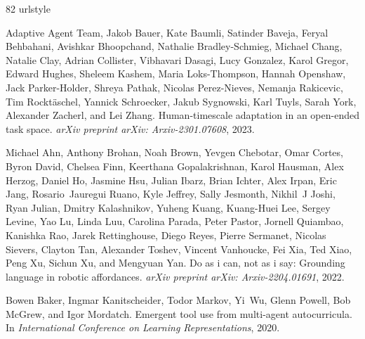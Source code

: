 \documentclass{article}
\begin{document}
\newpage
\begin{thebibliography}{82}
\providecommand{\natexlab}[1]{#1}
\providecommand{\url}[1]{\texttt{#1}}
\expandafter\ifx\csname urlstyle\endcsname\relax
  \providecommand{\doi}[1]{doi: #1}\else
  \providecommand{\doi}{doi: \begingroup \urlstyle{rm}\Url}\fi

{Adaptive Agent Team}, Jakob Bauer, Kate Baumli, Satinder Baveja, Feryal Behbahani, Avishkar Bhoopchand, Nathalie Bradley-Schmieg, Michael Chang, Natalie Clay, Adrian Collister, Vibhavari Dasagi, Lucy Gonzalez, Karol Gregor, Edward Hughes, Sheleem Kashem, Maria Loks-Thompson, Hannah Openshaw, Jack Parker-Holder, Shreya Pathak, Nicolas Perez-Nieves, Nemanja Rakicevic, Tim Rocktäschel, Yannick Schroecker, Jakub Sygnowski, Karl Tuyls, Sarah York, Alexander Zacherl, and Lei Zhang.
\newblock Human-timescale adaptation in an open-ended task space.
\newblock \emph{arXiv preprint arXiv: Arxiv-2301.07608}, 2023.

Michael Ahn, Anthony Brohan, Noah Brown, Yevgen Chebotar, Omar Cortes, Byron David, Chelsea Finn, Keerthana Gopalakrishnan, Karol Hausman, Alex Herzog, Daniel Ho, Jasmine Hsu, Julian Ibarz, Brian Ichter, Alex Irpan, Eric Jang, Rosario~Jauregui Ruano, Kyle Jeffrey, Sally Jesmonth, Nikhil~J Joshi, Ryan Julian, Dmitry Kalashnikov, Yuheng Kuang, Kuang-Huei Lee, Sergey Levine, Yao Lu, Linda Luu, Carolina Parada, Peter Pastor, Jornell Quiambao, Kanishka Rao, Jarek Rettinghouse, Diego Reyes, Pierre Sermanet, Nicolas Sievers, Clayton Tan, Alexander Toshev, Vincent Vanhoucke, Fei Xia, Ted Xiao, Peng Xu, Sichun Xu, and Mengyuan Yan.
\newblock Do as i can, not as i say: Grounding language in robotic affordances.
\newblock \emph{arXiv preprint arXiv: Arxiv-2204.01691}, 2022.

Bowen Baker, Ingmar Kanitscheider, Todor Markov, Yi~Wu, Glenn Powell, Bob McGrew, and Igor Mordatch.
\newblock Emergent tool use from multi-agent autocurricula.
\newblock In \emph{International Conference on Learning Representations}, 2020.


\end{thebibliography}
\end{document}
